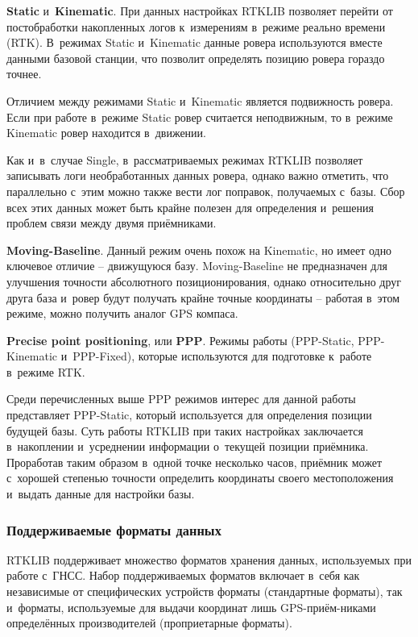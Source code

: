 \begin{dashitemize}
\begin{figure}[h!]
  \end{figure}
  \item \textbf{Static} и~\textbf{Kinematic}. При данных настройках RTKLIB позволяет перейти от постобработки накопленных логов к~измерениям в~режиме реально времени (RTK). В~режимах Static и~Kinematic данные ровера используются вместе данными базовой станции, что позволит определять позицию ровера гораздо точнее. \par
  Отличием между режимами Static и~Kinematic является подвижность ровера. Если при работе в~режиме Static ровер считается неподвижным, то в~режиме Kinematic ровер находится в~движении. \par
  Как и~в~случае Single, в~рассматриваемых режимах RTKLIB позволяет записывать логи необработанных данных ровера, однако важно отметить, что параллельно с~этим можно также вести лог поправок, получаемых с~базы. Сбор всех этих данных может быть крайне полезен для определения и~решения проблем связи между двумя приёмниками.
  \item \textbf{Moving-Baseline}. Данный режим очень похож на Kinematic, но имеет одно ключевое отличие -- движущуюся базу. Moving-Baseline не предназначен для улучшения точности абсолютного позиционирования, однако относительно друг друга база и~ровер будут получать крайне точные координаты -- работая в~этом режиме, можно получить аналог GPS компаса.
  \item \textbf{Precise point positioning}, или \textbf{PPP}. Режимы работы (PPP-Static, PPP-Kinematic и~PPP-Fixed), которые используются для подготовке к~работе в~режиме RTK. \par
  Среди перечисленных выше PPP режимов интерес для данной работы представляет PPP-Static, который используется для определения позиции будущей базы. Суть работы RTKLIB при таких настройках заключается в~накоплении и~усреднении информации о~текущей позиции приёмника. Проработав таким образом в~одной точке несколько часов, приёмник может с~хорошей степенью точности определить координаты своего местоположения и~выдать данные для настройки базы.
\end{dashitemize}

\subsubsection{Поддерживаемые форматы данных}

RTKLIB поддерживает множество форматов хранения данных, используемых при работе с~ГНСС. Набор поддерживаемых форматов включает в~себя как независимые от специфических устройств форматы (стандартные форматы), так и~форматы, используемые для выдачи координат лишь GPS-приём-никами определённых производителей (проприетарные форматы). \par

